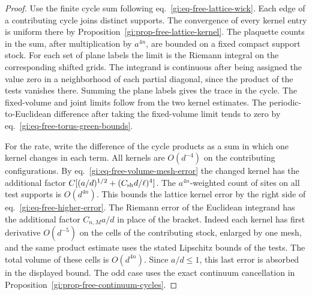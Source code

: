 \documentclass[11pt,letterpaper,reqno]{amsart}
\numberwithin{equation}{section}
\renewcommand{\eqref}[1]{\textup{eq.~\ref{#1}}}
\theoremstyle{definition}
\theoremstyle{remark}
\begin{document}
\begin{proof}
Use the finite cycle sum following \eqref{gi:eq-free-lattice-wick}.
Each edge of a contributing cycle joins distinct supports.
The convergence of every kernel entry is uniform there by
Proposition~\ref{gi:prop-free-lattice-kernel}.
The plaquette counts in the sum, after multiplication by
\(a^{4n}\), are bounded on a fixed compact support stock.
For each set of plane labels the limit is the Riemann integral
on the corresponding shifted grids. The integrand is continuous
after being assigned the value zero in a neighborhood of each
partial diagonal, since the product of the tests vanishes
there. Summing the plane labels gives the trace in the cycle.
The fixed-volume and joint limits follow from the two kernel
estimates. The periodic-to-Euclidean difference after taking
the fixed-volume limit tends to zero by
\eqref{gi:eq-free-torus-green-bounds}.

For the rate, write the difference of the cycle products as
a sum in which one kernel changes in each term. All kernels
are \(O(d^{-4})\) on the contributing configurations.
By \eqref{gi:eq-free-volume-mesh-error} the changed kernel
has the additional factor \(C[(a/d)^{1/2}+(C_{\rm sh}d/\ell)^4]\).
The \(a^{4n}\)-weighted
count of sites on all test supports is \(O(d^{4n})\).
This bounds the lattice kernel error by the right side of
\eqref{gi:eq-free-higher-error}. The Riemann error of the
Euclidean integrand has the additional factor \(C_{n,M}a/d\)
in place of the bracket. Indeed each kernel has first
derivative \(O(d^{-5})\) on the cells of the contributing
stock, enlarged by one mesh, and the same product estimate
uses the stated Lipschitz bounds of the tests. The total
volume of these cells is \(O(d^{4n})\).
Since \(a/d\le1\), this last error is absorbed in the
displayed bound. The odd case uses the exact continuum
cancellation in Proposition~\ref{gi:prop-free-continuum-cycles}.
\end{proof}
\end{document}
